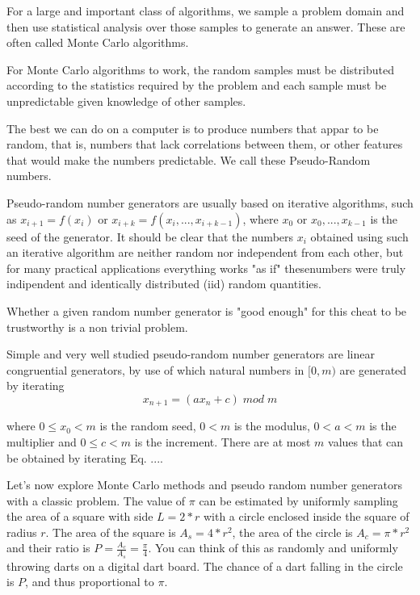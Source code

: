 \documentclass{article}
\begin{document}
For a large and important class of algorithms, we sample a problem domain and then use statistical analysis over those samples
to generate an answer. These are often called Monte Carlo algorithms.

For Monte Carlo algorithms to work, the random samples must be distributed according to the statistics required by the problem and each sample must be 
unpredictable given knowledge of other samples. 

The best we can do on a computer is to produce numbers that appar to be random, that is, numbers that lack correlations between them, or other features that would 
make the numbers predictable. We call these Pseudo-Random numbers.

Pseudo-random number generators are usually based on iterative algorithms, such as $x_{i+1}=f(x_i)$ or $x_{i+k}=f(x_i,...,x_{i+k-1})$, where $x_0$ or 
$x_0,...,x_{k-1}$ is the seed of the generator. It should be clear that the numbers $x_i$ obtained using such an iterative algorithm are neither random
nor independent from each other, but for many practical applications everything works "as if" thesenumbers were truly indipendent and identically distributed (iid) random quantities.

Whether a given random number generator is "good enough" for this cheat to be trustworthy is a non trivial problem. 

Simple and very well studied pseudo-random number generators are linear congruential generators, by use of which natural numbers in $[0, m)$ are generated
by iterating 
\begin{equation}\label{eq:lcg}
x_{n+1}=(ax_n+c)\;mod\;m
\end{equation}

where $0\leq x_0<m$ is the random seed, $0<m$ is the modulus, $0< a<m$ is the multiplier and $0\leq c < m$ is the increment. There are at most $m$
values that can be obtained by iterating Eq. ....

Let's now explore Monte Carlo methods and pseudo random number generators with a classic problem. The value of $\pi$ can be estimated by uniformly sampling the area of a square
with side $L=2*r$ with a circle enclosed inside the square of radius $r$. The area of the square is $A_s=4*r^2$, the area of the circle is $A_c = \pi*r^2$ and their ratio is
$P=\frac{A_c}{A_s}=\frac{\pi}{4}$. You can think of this as randomly and uniformly throwing darts on a digital dart board. The chance of a dart falling in the circle is $P$, and thus
proportional to $\pi$.
\end{document}

